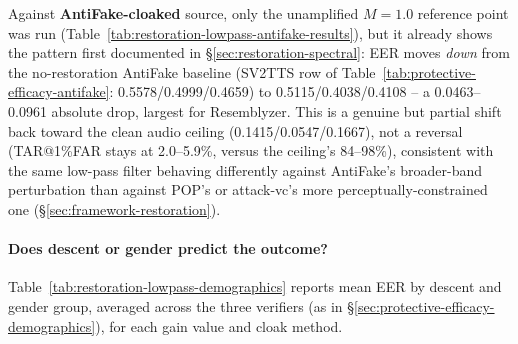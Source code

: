 \documentclass[11pt]{article}
\begin{document}
Against \textbf{AntiFake-cloaked} source, only the unamplified $M=1.0$
reference point was run (Table~\ref{tab:restoration-lowpass-antifake-results}),
but it already shows the pattern first documented in
\S\ref{sec:restoration-spectral}: EER moves \emph{down} from the
no-restoration AntiFake baseline (SV2TTS row of
Table~\ref{tab:protective-efficacy-antifake}: 0.5578/0.4999/0.4659) to
0.5115/0.4038/0.4108 -- a 0.0463--0.0961 absolute drop, largest for
Resemblyzer. This is a genuine but partial shift back toward the clean
audio ceiling (0.1415/0.0547/0.1667), not a reversal (TAR@1\%FAR stays
at 2.0--5.9\%, versus the ceiling's 84--98\%), consistent with the same
low-pass filter behaving differently against AntiFake's broader-band
perturbation than against POP's or attack-vc's more
perceptually-constrained one (\S\ref{sec:framework-restoration}).

\paragraph{Does descent or gender predict the outcome?}
Table~\ref{tab:restoration-lowpass-demographics} reports mean EER by
descent and gender group, averaged across the three verifiers (as in
\S\ref{sec:protective-efficacy-demographics}), for each gain value and
cloak method.
\end{document}
